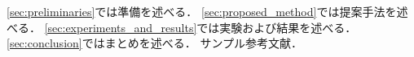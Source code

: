 \cref{sec:preliminaries}では準備を述べる．
\cref{sec:proposed_method}では提案手法を述べる．
\cref{sec:experiments_and_results}では実験および結果を述べる．
\cref{sec:conclusion}ではまとめを述べる．
サンプル参考文献\cite{sample2023}．

